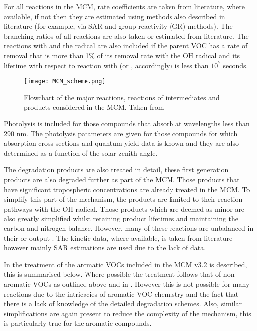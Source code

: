 For all reactions in the MCM, rate coefficients are taken from literature, where available, if not then they are estimated 
using methods also described in literature (for example, via SAR and group reactivity (GR) methods). The branching ratios of 
all reactions are also taken or estimated from literature. The reactions with  and the  radical are also 
included if the parent VOC has a rate of removal that is more than 1\% of its removal rate with the OH radical and its lifetime
with respect to reaction with  (or , accordingly) is less than $10^7$ seconds.
\begin{figure}
    \begin{center}
        \texttt{[image: MCM\_scheme.png]}
        \caption{Flowchart of the major reactions, reactions of intermediates and products considered in the MCM. Taken from \citep{Saunders:2003}}
        \label{f:MCM_scheme}
    \end{center}
\end{figure}

Photolysis is included for those compounds that absorb at wavelengths less than 290 nm. The photolysis parameters are given for
those  compounds for which absorption cross-sections and quantum yield data is known and they are also determined as a function
of the solar zenith angle. 

The degradation products are also treated in detail, these first generation products are also degraded further as part of the 
MCM. Those products that have significant tropospheric concentrations are already treated in the MCM. To simplify this part of 
the mechanism, the products are limited to their reaction pathways with the OH radical. Those products which are deemed as 
minor are also greatly simplified whilst retaining product lifetimes and maintaining the carbon and nitrogen balance. However, 
many of these reactions are unbalanced in their  or  output \citep{Jenkin:1997}. The kinetic data, where 
available, is taken from literature however mainly SAR estimations are used due to the lack of data.

In \citep{Jenkin:2003} the treatment of the aromatic VOCs included in the MCM v3.2 is described, this is summarised below. Where
possible the treatment follows that of non-aromatic VOCs as outlined above and in \citep{Saunders:2003}. However this is not 
possible for many reactions due to the intricacies of aromatic VOC chemistry and the fact that there is a lack of knowledge of 
the detailed degradation schemes. Also, similar simplifications are again present to reduce the complexity of the mechanism, 
this is particularly true for the  aromatic compounds.

